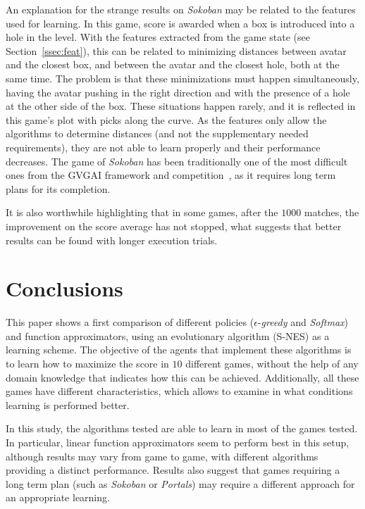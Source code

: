\documentclass[conference]{IEEEtran}
\begin{document}
An explanation for the strange results on \textit{Sokoban} may be related to the features used for learning. In this game, score is awarded when a box is introduced into a hole in the level. With the features extracted from the game state (see Section~\ref{ssec:feat}), this can be related to minimizing distances between avatar and the closest box, and between the avatar and the closest hole, both at the same time. The problem is that these minimizations must happen simultaneously, having the avatar pushing in the right direction and with the presence of a hole at the other side of the box. These situations happen rarely, and it is reflected in this game's plot with picks along the curve. As the features only allow the algorithms to determine distances (and not the supplementary needed requirements), they are not able to learn properly and their performance decreases. The game of \textit{Sokoban} has been traditionally one of the most difficult ones from the GVGAI framework and competition~\cite{Perez2015}, as it requires long term plans for its completion.

It is also worthwhile highlighting that in some games, after the $1000$ matches, the improvement on the score average has not stopped, what suggests that better results can be found with longer execution trials.


\section{Conclusions} \label{sec:conc}

This paper shows a first comparison of different policies ($\epsilon$-\textit{greedy} and \textit{Softmax}) and function approximators, using an evolutionary algorithm (S-NES) as a learning scheme. The objective of the agents that implement these algorithms is to learn how to maximize the score in $10$ different games, without the help of any domain knowledge that indicates how this can be achieved. Additionally, all these games have different characteristics, which allows to examine in what conditions learning is performed better.

In this study, the algorithms tested are able to learn in most of the games tested. In particular, linear function approximators seem to perform best in this setup, although results may vary from game to game, with different algorithms providing a distinct performance. Results also suggest that games requiring a long term plan (such as \textit{Sokoban} or \textit{Portals}) may require a different approach for an appropriate learning. 
\end{document}
